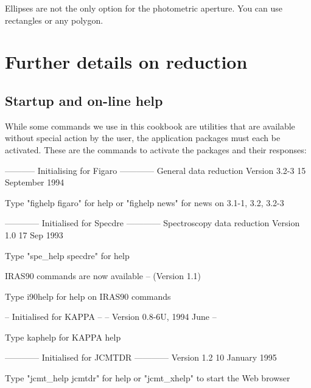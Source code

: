 \documentclass[11pt,noabs]{starlink}
\begin{document}
   Ellipses are not the only option for the photometric aperture. You
   can use rectangles or any polygon.


\newpage
\section{Further details on reduction}

\subsection{\label{start2}Startup and on-line help}

   While some commands we use in this cookbook are utilities that are
   available without special action by the user, the application packages
   must each be activated. These are the commands to activate the
   packages
 and their responses:

\begin{terminalv}

----------- Initialising for  Figaro ------------
             General data reduction
        Version 3.2-3  15 September 1994

         Type "fighelp figaro" for help
   or "fighelp news" for news on 3.1-1, 3.2, 3.2-3


------------ Initialised for Specdre ------------
           Spectroscopy data reduction
            Version 1.0   17 Sep 1993

         Type "spe_help specdre" for help


  IRAS90 commands are now available -- (Version 1.1)

  Type i90help for help on IRAS90 commands


--     Initialised for KAPPA      --
--   Version 0.8-6U, 1994 June    --

   Type kaphelp for KAPPA help


------------ Initialised for JCMTDR ------------
          Version 1.2  10 January 1995

        Type "jcmt_help jcmtdr" for help
     or "jcmt_xhelp" to start the Web browser
\end{terminalv}
\end{document}
